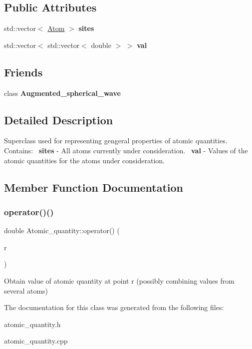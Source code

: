 \subsection*{Public Attributes}
\begin{DoxyCompactItemize}
\item 
\mbox{\label{classAtomic__quantity_a1303f629c4a471e75f418c10bc6c20ca}} 
std\+::vector$<$ \hyperlink{classAtom}{Atom} $>$ {\bfseries sites}
\item 
\mbox{\label{classAtomic__quantity_a69f4c5e435c8c32883528b7cf2099616}} 
std\+::vector$<$ std\+::vector$<$ double $>$ $>$ {\bfseries val}
\end{DoxyCompactItemize}
\subsection*{Friends}
\begin{DoxyCompactItemize}
\item 
\mbox{\label{classAtomic__quantity_a678ccaacc1630da5784025bf4ba898bb}} 
class {\bfseries Augmented\+\_\+spherical\+\_\+wave}
\end{DoxyCompactItemize}


\subsection{Detailed Description}
Superclass used for representing gengeral properties of atomic quantities.~\newline
Contains\+:~\newline
{\bfseries sites} -\/ All atoms currently under consideration.~\newline
{\bfseries val} -\/ Values of the atomic quantities for the atoms under consideration.~\newline


\subsection{Member Function Documentation}
\mbox{\label{classAtomic__quantity_a5bd9055fdf94e57e54a355d5aa818b6c}} 
\subsubsection{\texorpdfstring{operator()()}{operator()()}}
{\footnotesize\ttfamily double Atomic\+\_\+quantity\+::operator() (\begin{DoxyParamCaption}\item[{const G\+S\+L\+::\+Vector \&}]{r }\end{DoxyParamCaption})}

Obtain value of atomic quantity at point r (possibly combining values from several atoms) 

The documentation for this class was generated from the following files\+:\begin{DoxyCompactItemize}
\item 
atomic\+\_\+quantity.\+h\item 
atomic\+\_\+quantity.\+cpp\end{DoxyCompactItemize}
